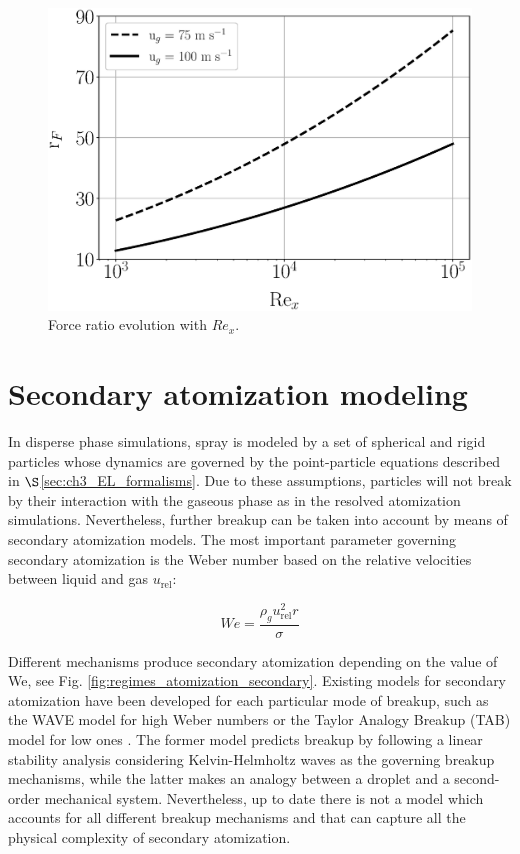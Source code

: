 \begin{figure}[h!]
	\centering
	\includegraphics[scale=0.5]{./part2_developments/figures_ch4_SLI/ALM_rF_vs_Rex.eps}
	\caption{Force ratio evolution with $Re_x$.}
	\label{fig:ALM_rF_vs_Rex}
\end{figure}


\section{Secondary atomization modeling}
\label{sec:ch4_secondary_atomization_modeling}

In disperse phase simulations, spray is modeled by a set of spherical and rigid particles whose dynamics are governed by the point-particle equations described in $\S$\ref{sec:ch3_EL_formalisms}. Due to these assumptions, particles will not break by their interaction with the gaseous phase as in the resolved atomization simulations. Nevertheless, further breakup can be taken into account by means of secondary atomization models. The most important parameter governing secondary atomization is the Weber number based on the relative velocities between liquid and gas $u_\mathrm{rel}$:

\begin{equation}
\label{eq:We_secondary_atomization_definition}
We = \frac{\rho_g u_\mathrm{rel}^2 r}{\sigma} 
\end{equation}

Different mechanisms produce secondary atomization depending on the value of We, see Fig. \ref{fig:regimes_atomization_secondary}. Existing models for secondary atomization have been developed for each particular mode of breakup, such as the WAVE model for high Weber numbers  or the Taylor Analogy Breakup (TAB) model for low ones . The former model predicts breakup by following a linear stability analysis considering Kelvin-Helmholtz waves as the governing breakup mechanisms, while the latter makes an analogy between a droplet and a second-order mechanical system. Nevertheless, up to date there is not a model which accounts for all different breakup mechanisms and that can capture all the physical complexity of secondary atomization.

